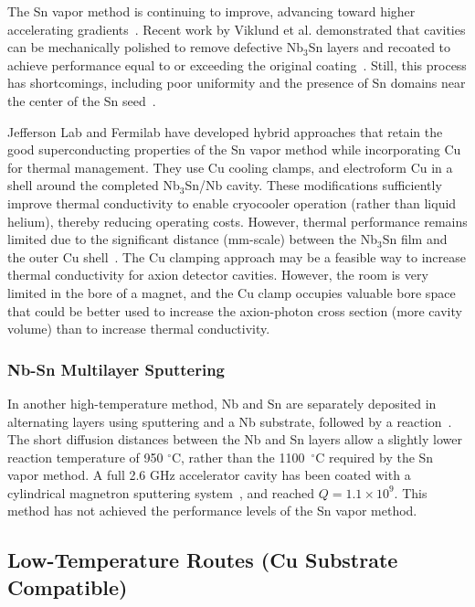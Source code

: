     The Sn vapor method is continuing to improve, advancing toward higher accelerating gradients~\cite{posenNb3SnSuperconductingRadiofrequency2022, Posen:2018zjb, Posen:2020kei}. Recent work by Viklund et al. demonstrated that cavities can be mechanically polished to remove defective Nb$_3$Sn layers and recoated to achieve performance equal to or exceeding the original coating~\cite{Viklund:2023uxj, Viklund:2023nlq, Viklund:2024lew}. Still, this process has shortcomings, including poor uniformity and the presence of Sn domains near the center of the Sn seed~\cite{Viklund:2023uxj}.

    Jefferson Lab and Fermilab have developed hybrid approaches that retain the good superconducting properties of the Sn vapor method while incorporating Cu for thermal management. They use Cu cooling clamps, and electroform Cu in a shell around the completed Nb$_3$Sn/Nb cavity. These modifications sufficiently improve thermal conductivity to enable cryocooler operation (rather than liquid helium), thereby reducing operating costs. However, thermal performance remains limited due to the significant distance (mm-scale) between the Nb$_3$Sn film and the outer Cu shell~\cite{ciovatiDesignCwLowenergy2018, posenNb3SnSuperconductingRadiofrequency2022}. The Cu clamping approach may be a feasible way to increase thermal conductivity for axion detector cavities. However, the room is very limited in the bore of a magnet, and the Cu clamp occupies valuable bore space that could be better used to increase the axion-photon cross section (more cavity volume) than to increase thermal conductivity.
        
    \subsubsection{Nb-Sn Multilayer Sputtering}
    
    In another high-temperature method, Nb and Sn are separately deposited in alternating layers using sputtering and a Nb substrate, followed by a reaction~\cite{vandenbergNewPhaseFormation1985}. The short diffusion distances between the Nb and Sn layers allow a slightly lower reaction temperature of 950 $^\circ$C, rather than the 1100~$^\circ$C required by the Sn vapor method. A full 2.6 GHz accelerator cavity has been coated with a cylindrical magnetron sputtering system~\cite{Shakel:2023cdz}, and reached $Q = 1.1 \times10^9$. This method has not achieved the performance levels of the Sn vapor method.

    \subsection{Low-Temperature Routes (Cu Substrate Compatible)}

